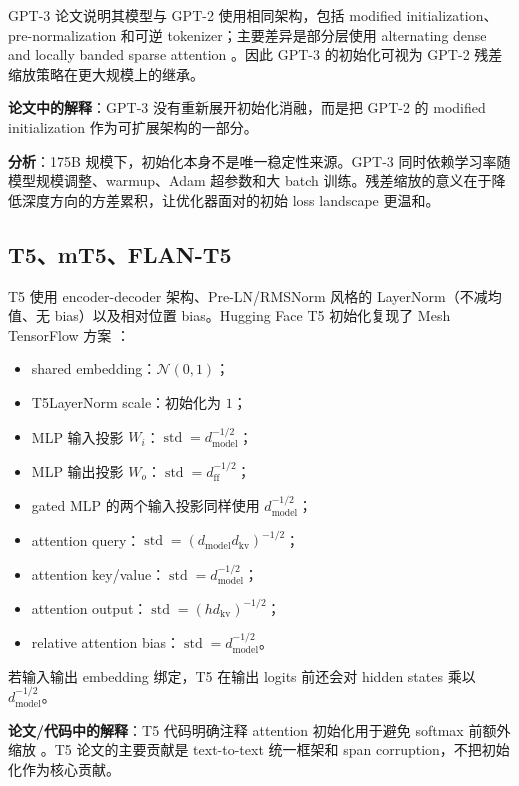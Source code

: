 \documentclass[UTF8,a4paper,11pt]{ctexart}
\newcommand{\Normal}{\mathcal{N}}
\newcommand{\std}{\operatorname{std}}
\begin{document}
GPT-3 论文说明其模型与 GPT-2 使用相同架构，包括 modified initialization、pre-normalization 和可逆 tokenizer；主要差异是部分层使用 alternating dense and locally banded sparse attention \cite{gpt3paper}。因此 GPT-3 的初始化可视为 GPT-2 残差缩放策略在更大规模上的继承。

\textbf{论文中的解释}：GPT-3 没有重新展开初始化消融，而是把 GPT-2 的 modified initialization 作为可扩展架构的一部分。

\textbf{分析}：175B 规模下，初始化本身不是唯一稳定性来源。GPT-3 同时依赖学习率随模型规模调整、warmup、Adam 超参数和大 batch 训练。残差缩放的意义在于降低深度方向的方差累积，让优化器面对的初始 loss landscape 更温和。

\subsection{T5、mT5、FLAN-T5}

T5 使用 encoder-decoder 架构、Pre-LN/RMSNorm 风格的 LayerNorm（不减均值、无 bias）以及相对位置 bias。Hugging Face T5 初始化复现了 Mesh TensorFlow 方案 \cite{t5paper,t5hfcode}：

\begin{itemize}
  \item shared embedding：$\Normal(0,1)$；
  \item T5LayerNorm scale：初始化为 $1$；
  \item MLP 输入投影 $W_i$：$\std=d_{\mathrm{model}}^{-1/2}$；
  \item MLP 输出投影 $W_o$：$\std=d_{\mathrm{ff}}^{-1/2}$；
  \item gated MLP 的两个输入投影同样使用 $d_{\mathrm{model}}^{-1/2}$；
  \item attention query：$\std=(d_{\mathrm{model}}d_{\mathrm{kv}})^{-1/2}$；
  \item attention key/value：$\std=d_{\mathrm{model}}^{-1/2}$；
  \item attention output：$\std=(h d_{\mathrm{kv}})^{-1/2}$；
  \item relative attention bias：$\std=d_{\mathrm{model}}^{-1/2}$。
\end{itemize}

若输入输出 embedding 绑定，T5 在输出 logits 前还会对 hidden states 乘以 $d_{\mathrm{model}}^{-1/2}$。

\textbf{论文/代码中的解释}：T5 代码明确注释 attention 初始化用于避免 softmax 前额外缩放 \cite{t5hfcode}。T5 论文的主要贡献是 text-to-text 统一框架和 span corruption，不把初始化作为核心贡献。
\end{document}
